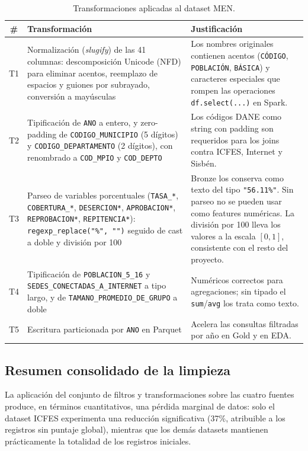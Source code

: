 \begin{table}[H]
\centering
\caption{Transformaciones aplicadas al dataset MEN.}
\begin{tabularx}{\textwidth}{c l X}
\toprule
\textbf{\#} & \textbf{Transformación} & \textbf{Justificación} \\
\midrule
T1 & Normalización (\textit{slugify}) de las 41 columnas: descomposición Unicode (NFD) para eliminar acentos, reemplazo de espacios y guiones por subrayado, conversión a mayúsculas & Los nombres originales contienen acentos (\texttt{CÓDIGO}, \texttt{POBLACIÓN}, \texttt{BÁSICA}) y caracteres especiales que rompen las operaciones \texttt{df.select(...)} en Spark. \\
T2 & Tipificación de \texttt{ANO} a entero, y zero-padding de \texttt{CODIGO\_MUNICIPIO} (5 dígitos) y \texttt{CODIGO\_DEPARTAMENTO} (2 dígitos), con renombrado a \texttt{COD\_MPIO} y \texttt{COD\_DEPTO} & Los códigos DANE como string con padding son requeridos para los joins contra ICFES, Internet y Sisbén. \\
T3 & Parseo de variables porcentuales (\texttt{TASA\_*}, \texttt{COBERTURA\_*}, \texttt{DESERCION*}, \texttt{APROBACION*}, \texttt{REPROBACION*}, \texttt{REPITENCIA*}): \texttt{regexp\_replace("\%", "")} seguido de cast a doble y división por 100 & Bronze los conserva como texto del tipo \texttt{"56.11\%"}. Sin parseo no se pueden usar como features numéricas. La división por 100 lleva los valores a la escala $[0, 1]$, consistente con el resto del proyecto. \\
T4 & Tipificación de \texttt{POBLACION\_5\_16} y \texttt{SEDES\_CONECTADAS\_A\_INTERNET} a tipo largo, y de \texttt{TAMANO\_PROMEDIO\_DE\_GRUPO} a doble & Numéricos correctos para agregaciones; sin tipado el \texttt{sum}/\texttt{avg} los trata como texto. \\
T5 & Escritura particionada por \texttt{ANO} en Parquet & Acelera las consultas filtradas por año en Gold y en EDA. \\
\bottomrule
\end{tabularx}
\end{table}

\subsection{Resumen consolidado de la limpieza}
La aplicación del conjunto de filtros y transformaciones sobre las cuatro fuentes produce, en términos cuantitativos, una pérdida marginal de datos: solo el dataset ICFES experimenta una reducción significativa (37\%, atribuible a los registros sin puntaje global), mientras que los demás datasets mantienen prácticamente la totalidad de los registros iniciales.

